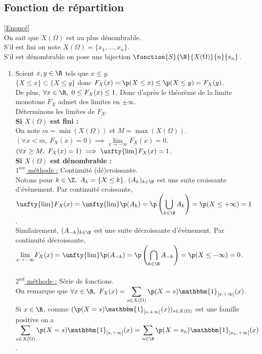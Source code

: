 \documentclass[8pt]{book}
\begin{document}
	\subsection{Fonction de répartition }
	\label{Fonction de répartition corrigé}
		\textcolor{blue}{\hyperref[Fonction de répartition]{[Enoncé]}}\\
	On sait que $X(\Omega)$ est au plus dénombrable.\\
	S'il est fini on note $X(\Omega)=\{x_1,\dots,x_n\}$.\\ 
	S'il est dénombrable on pose une bijection $\fonction{S}{\N}{X(\Omega)}{n}{s_n}$.
	\begin{enumerate}
		\item Soient $x,y\in \R$ tels que $x\leq y$.\\
		$\{X\leq x\}\subset \{X\leq y\}$ donc $F_X(x)=\p(X\leq x)\leq \p(X\leq y)=F_X(y)$.\\
		De plus, $\forall x\in \R,\ 0\leq F_X(x)\leq 1$. Donc d'après le théorème de la limite monotone $F_X$ admet des limites en $\pm\infty$.\\
		Déterminons les limites de $F_X$.\\
		\textbf{Si $X(\Omega)$ est fini :}\\
		On note $m=\min(X(\Omega))$ et $M=\max(X(\Omega))$.
		$(\forall x<m,\ F_X(x)=0)\implies \underset{x\to -\infty}{\lim}F_X(x)=0$.\\
		$(\forall x\geq M,\ F_X(x)=1)\implies \uxfty{\lim}F_X(x)=1$.\\
		\textbf{Si $X(\Omega)$ est dénombrable :}\\
		\underline{$1^{ère}$ méthode :} Continuité (dé)croissante.\\
		Notons pour $k\in \Z,\ A_k=\{X\leq k\}$. $(A_k)_{k\in \N}$ est une suite croissante d'évènement. Par continuité croissante,\\
		$\uxfty{\lim}F_X(x)=\unfty{\lim}\p(A_k)=\p\left(\displaystyle\bigcup\limits_{k\in \N}A_k\right)=\p(X\leq +\infty)=1$.\\
		Similairement, $(A_{-k})_{k\in \N}$ est une suite décroissante d'évènement. Par continuité décroissante,\\
		$\underset{x\to -\infty}{\lim}F_X(x)=\unfty{\lim}\p(A_{-k})=\p\left(\displaystyle\bigcap\limits_{k\in \N}A_{-k}\right)=\p(X\leq -\infty)=0$.\\\\
		\underline{$2^{nd}$ méthode :} Série de fonctions.\\
		On remarque que $\forall x\in \R,\ F_X(x)=\displaystyle\sum\limits_{s\in X(\Omega)}\p(X=s)\mathbbm{1}_{[s,+\infty[}(x)$. Si $x\in \R$, comme $(\p(X=s)\mathbbm{1}_{[s,+\infty[}(x))_{s\in X(\Omega)}$ est une famille positive on a $\displaystyle\sum\limits_{s\in X(\Omega)}\p(X=s)\mathbbm{1}_{[s,+\infty[}(x)=\sum\limits_{n\in \N}\p(X=s_n)\mathbbm{1}_{[s_n,+\infty[}(x)$.\\

\end{enumerate}
\end{document}
